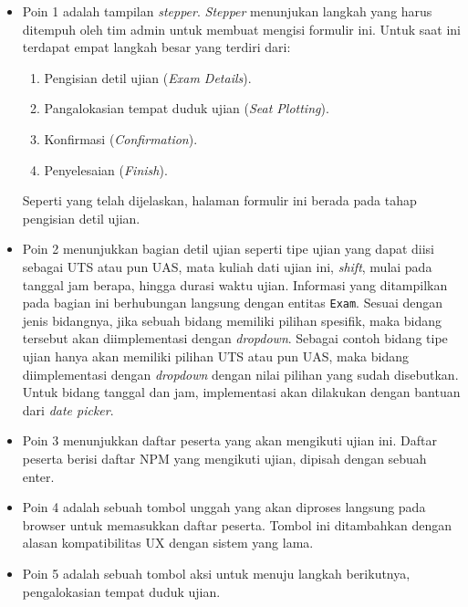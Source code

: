     \begin{itemize}
        \item Poin 1 adalah tampilan \textit{stepper}. \textit{Stepper}
            menunjukan langkah yang harus ditempuh oleh tim admin untuk membuat
            mengisi formulir ini. Untuk saat ini terdapat empat langkah besar
            yang terdiri dari:
                \begin{enumerate}
                    \item Pengisian detil ujian (\textit{Exam Details}).
                    \item Pangalokasian tempat duduk ujian (\textit{Seat
                    Plotting}).
                    \item Konfirmasi (\textit{Confirmation}).
                    \item Penyelesaian (\textit{Finish}).
                \end{enumerate}
            Seperti yang telah dijelaskan, halaman formulir ini berada pada
            tahap pengisian detil ujian.
            
        \item Poin 2 menunjukkan bagian detil ujian seperti tipe ujian yang
            dapat diisi sebagai UTS atau pun UAS, mata kuliah dati ujian ini,
            \textit{shift}, mulai pada tanggal jam berapa, hingga durasi waktu
            ujian. Informasi yang ditampilkan pada bagian ini berhubungan
            langsung dengan entitas \texttt{Exam}. Sesuai dengan jenis
            bidangnya, jika sebuah bidang memiliki pilihan spesifik, maka bidang
            tersebut akan diimplementasi dengan \textit{dropdown}. Sebagai
            contoh bidang tipe ujian hanya akan memiliki pilihan UTS atau pun
            UAS, maka bidang diimplementasi dengan \textit{dropdown} dengan
            nilai pilihan yang sudah disebutkan. Untuk bidang tanggal dan jam,
            implementasi akan dilakukan dengan bantuan dari \textit{date
            picker}.
            
        \item Poin 3 menunjukkan daftar peserta yang akan mengikuti ujian ini.
            Daftar peserta berisi daftar NPM yang mengikuti ujian, dipisah
            dengan sebuah enter.
            
        \item Poin 4 adalah sebuah tombol unggah yang akan diproses langsung
            pada browser untuk memasukkan daftar peserta. Tombol ini ditambahkan
            dengan alasan kompatibilitas UX dengan sistem yang lama.
            
        \item Poin 5 adalah sebuah tombol aksi untuk menuju langkah berikutnya,
            pengalokasian tempat duduk ujian.
        
    \end{itemize}
    
